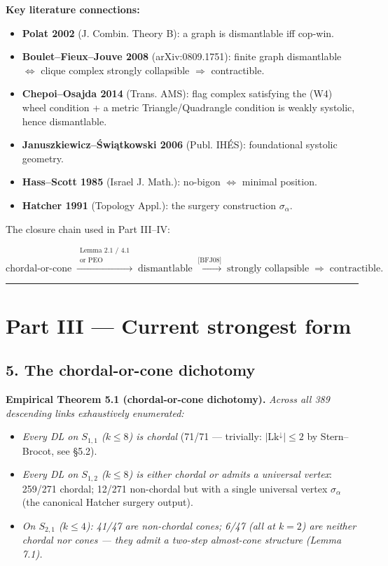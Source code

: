 \documentclass[
]{article}
\providecommand{\tightlist}{%
  \setlength{\itemsep}{0pt}\setlength{\parskip}{0pt}}
\begin{document}
\textbf{Key literature connections:}

\begin{itemize}
\tightlist
\item
  \textbf{Polat 2002} (J. Combin. Theory B): a graph is dismantlable iff
  cop-win.
\item
  \textbf{Boulet--Fieux--Jouve 2008} (arXiv:0809.1751): finite graph
  dismantlable \(\Leftrightarrow\) clique complex strongly collapsible
  \(\Rightarrow\) contractible.
\item
  \textbf{Chepoi--Osajda 2014} (Trans. AMS): flag complex satisfying the
  (W4) wheel condition + a metric Triangle/Quadrangle condition is
  weakly systolic, hence dismantlable.
\item
  \textbf{Januszkiewicz--Świątkowski 2006} (Publ. IHÉS): foundational
  systolic geometry.
\item
  \textbf{Hass--Scott 1985} (Israel J. Math.): no-bigon
  \(\Leftrightarrow\) minimal position.
\item
  \textbf{Hatcher 1991} (Topology Appl.): the surgery construction
  \(\sigma_\alpha\).
\end{itemize}

The closure chain used in Part III--IV:

\[
\text{chordal-or-cone}
\;\xrightarrow{\substack{\text{Lemma 2.1 / 4.1}\\\text{or PEO}}}\;
\text{dismantlable}
\;\xrightarrow{\text{[BFJ08]}}\;
\text{strongly collapsible}
\;\Rightarrow\;
\text{contractible}.
\]

\begin{center}\rule{0.5\linewidth}{0.5pt}\end{center}

\section{Part III --- Current strongest
form}\label{part-iii-current-strongest-form}

\subsection{5. The chordal-or-cone
dichotomy}\label{the-chordal-or-cone-dichotomy}

\textbf{Empirical Theorem 5.1 (chordal-or-cone dichotomy).} \emph{Across
all 389 descending links exhaustively enumerated:}

\begin{itemize}
\tightlist
\item
  \emph{Every DL on \(S_{1,1}\) (\(k \le 8\)) is chordal} (71/71 ---
  trivially: \(|\mathrm{Lk}^\downarrow|\le 2\) by Stern--Brocot, see
  §5.2).
\item
  \emph{Every DL on \(S_{1,2}\) (\(k \le 8\)) is either chordal or
  admits a universal vertex}: 259/271 chordal; 12/271 non-chordal but
  with a single universal vertex \(\sigma_\alpha\) (the canonical
  Hatcher surgery output).
\item
  \emph{On \(S_{2,1}\) (\(k \le 4\)): 41/47 are non-chordal cones; 6/47
  (all at \(k=2\)) are neither chordal nor cones --- they admit a
  two-step almost-cone structure (Lemma 7.1).}
\end{itemize}
\end{document}
